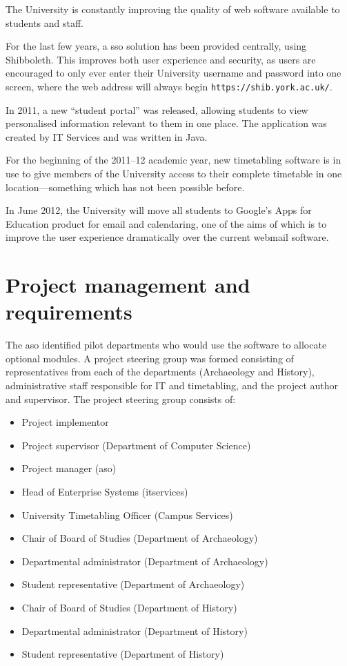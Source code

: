\documentclass[]{scrartcl}
\begin{document}

The University is constantly improving the quality of web software available
to students and staff.

For the last few years, a \gls{sso} solution has been provided
centrally, using Shibboleth. This improves both user experience and security,
as users are encouraged to only ever enter their University username and
password into one screen, where the web address will always begin
\texttt{https://shib.york.ac.uk/}.

In 2011, a new ``student portal'' was released, allowing students to view
personalised information relevant to them in one place. The application was
created by IT Services and was written in Java.

For the beginning of the 2011--12 academic year, new timetabling software is in
use to give members of the University access to their complete timetable in
one location---something which has not been possible before.

In June 2012, the University will move all students to Google's Apps for
Education product for email and calendaring, one of the aims of which is to
improve the user experience dramatically over the current webmail software.

\section{Project management and requirements}
\label{sec:requirements}

The \gls{aso} identified pilot departments who would use the software to
allocate optional modules. A project steering group was formed consisting of
representatives from each of the departments (Archaeology and History),
administrative staff responsible for IT and timetabling, and the project
author and supervisor. The project steering group consists of:

\begin{itemize}
  \item Project implementor
  \item Project supervisor (Department of Computer Science)
  \item Project manager (\gls{aso})
  \item Head of Enterprise Systems (\gls{itservices}) 
  \item University Timetabling Officer (Campus Services)
  \item Chair of Board of Studies (Department of Archaeology)
  \item Departmental administrator (Department of Archaeology)
  \item Student representative (Department of Archaeology)  
  \item Chair of Board of Studies (Department of History)
  \item Departmental administrator (Department of History)
  \item Student representative (Department of History)  
\end{itemize}
\end{document}
